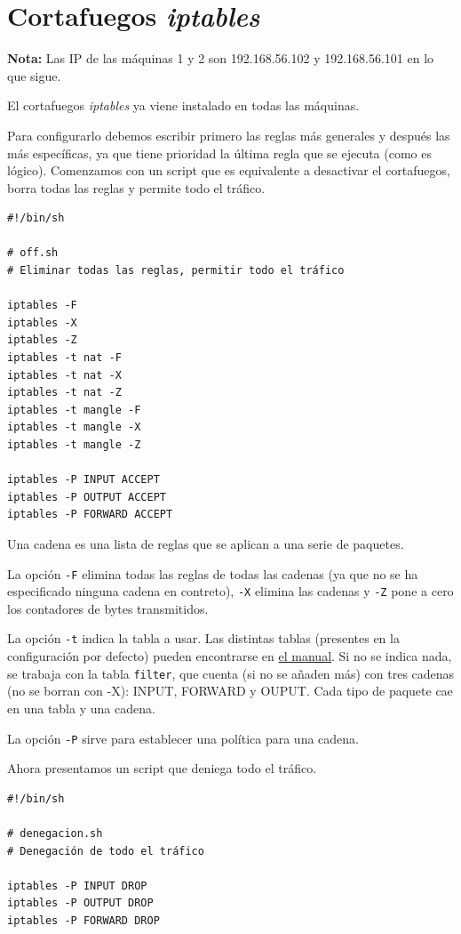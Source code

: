 \documentclass{article}
\begin{document}
\section{Cortafuegos \emph{iptables}}

\textbf{Nota:} Las IP de las máquinas 1 y 2 son 192.168.56.102 y 192.168.56.101 en lo que sigue.

El cortafuegos \emph{iptables} ya viene instalado en todas las máquinas.

Para configurarlo debemos escribir primero las reglas más generales y después las más específicas, ya que
tiene prioridad la última regla que se ejecuta (como es lógico). Comenzamos con un script que es equivalente
a desactivar el cortafuegos, borra todas las reglas y permite todo el tráfico.

\begin{Verbatim}
#!/bin/sh

# off.sh
# Eliminar todas las reglas, permitir todo el tráfico

iptables -F
iptables -X
iptables -Z
iptables -t nat -F
iptables -t nat -X
iptables -t nat -Z
iptables -t mangle -F
iptables -t mangle -X
iptables -t mangle -Z

iptables -P INPUT ACCEPT
iptables -P OUTPUT ACCEPT
iptables -P FORWARD ACCEPT
\end{Verbatim}

Una cadena es una lista de reglas que se aplican a una serie de paquetes.

La opción \texttt{-F} elimina todas las reglas de todas las cadenas (ya que no se ha especificado
ninguna cadena en contreto), \texttt{-X} elimina las cadenas y \texttt{-Z} pone a cero los contadores de bytes
transmitidos.

La opción \texttt{-t} indica la tabla a usar. Las distintas tablas (presentes en la configuración por defecto)
pueden encontrarse en \href{https://linux.die.net/man/8/iptables}{el manual}. Si no se indica nada, se trabaja
con la tabla \texttt{filter}, que cuenta (si no se añaden más) con tres cadenas (no se borran con -X): INPUT,
FORWARD y OUPUT. Cada tipo de paquete cae en una tabla y una cadena.

La opción \texttt{-P} sirve para establecer una política para una cadena.

Ahora presentamos un script que deniega todo el tráfico.

\begin{Verbatim}
#!/bin/sh

# denegacion.sh
# Denegación de todo el tráfico

iptables -P INPUT DROP
iptables -P OUTPUT DROP
iptables -P FORWARD DROP
\end{Verbatim}
\end{document}

